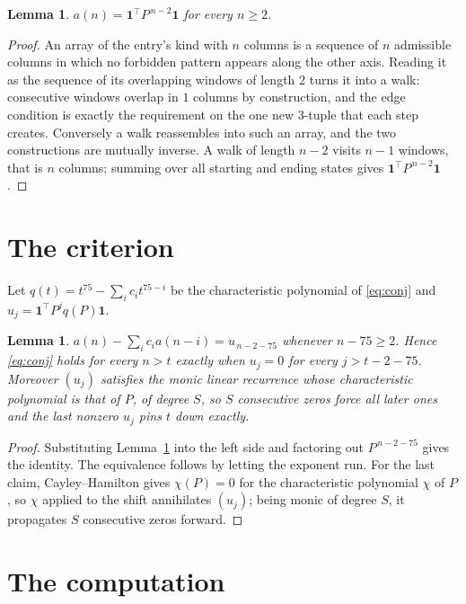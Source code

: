 \documentclass[11pt,a4paper]{article}
\theoremstyle{plain}
\newtheorem{lemma}[theorem]{Lemma}
\theoremstyle{definition}
\begin{document}
\begin{lemma}\label{lem:walk}
$a(n)=\mathbf{1}^{\!\top}P^{\,n-2}\mathbf{1}$ for every $n\ge2$.
\end{lemma}

\begin{proof}
An array of the entry's kind with $n$ columns is a sequence of $n$ admissible columns in
which no forbidden pattern appears along the other axis. Reading it as the sequence of its
overlapping windows of length $2$ turns it into a walk: consecutive windows overlap in
$1$ columns by construction, and the edge condition is exactly the requirement on the one
new $3$-tuple that each step creates. Conversely a walk reassembles into such an array,
and the two constructions are mutually inverse. A walk of length $n-2$ visits $n-1$
windows, that is $n$ columns; summing over all starting and ending states gives
$\mathbf{1}^{\!\top}P^{\,n-2}\mathbf{1}$.
\end{proof}

\section{The criterion}

Let $q(t)=t^{75}-\sum_i c_i t^{75-i}$ be the characteristic polynomial of
\eqref{eq:conj} and $u_j=\mathbf{1}^{\!\top}P^{j}q(P)\mathbf{1}$.

\begin{lemma}\label{lem:crit}
$a(n)-\sum_i c_i a(n-i)=u_{\,n-2-75}$ whenever $n-75\ge2$. Hence
\eqref{eq:conj} holds for every $n>t$ exactly when $u_j=0$ for every
$j>t-2-75$. Moreover $(u_j)$ satisfies the monic linear recurrence whose
characteristic polynomial is that of $P$, of degree $S$, so $S$ consecutive zeros force all
later ones and the last nonzero $u_j$ pins $t$ down exactly.
\end{lemma}

\begin{proof}
Substituting Lemma~\ref{lem:walk} into the left side and factoring out
$P^{\,n-2-75}$ gives the identity. The equivalence follows by letting the exponent
run. For the last claim, Cayley--Hamilton gives $\chi(P)=0$ for the characteristic
polynomial $\chi$ of $P$, so $\chi$ applied to the shift annihilates $(u_j)$; being monic of
degree $S$, it propagates $S$ consecutive zeros forward.
\end{proof}

\section{The computation}
\end{document}
